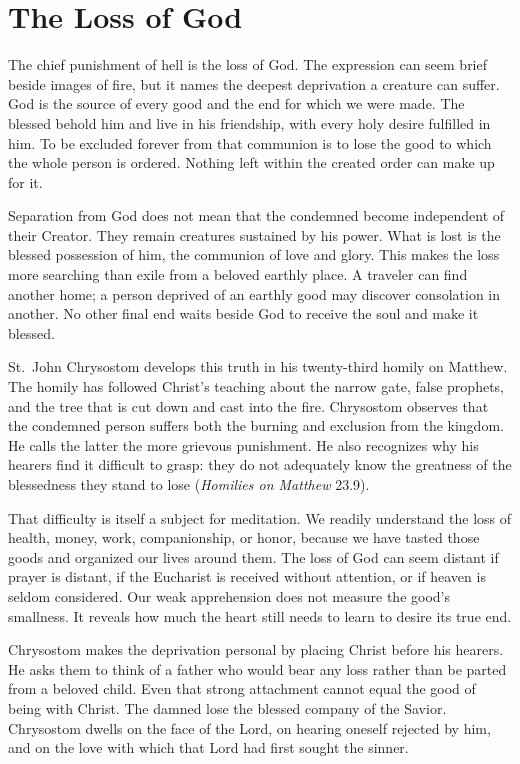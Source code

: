 \section{The Loss of God}

The chief punishment of hell is the loss of God. The expression can seem brief beside images of fire, but it names the deepest deprivation a creature can suffer. God is the source of every good and the end for which we were made. The blessed behold him and live in his friendship, with every holy desire fulfilled in him. To be excluded forever from that communion is to lose the good to which the whole person is ordered. Nothing left within the created order can make up for it.

Separation from God does not mean that the condemned become independent of their Creator. They remain creatures sustained by his power. What is lost is the blessed possession of him, the communion of love and glory. This makes the loss more searching than exile from a beloved earthly place. A traveler can find another home; a person deprived of an earthly good may discover consolation in another. No other final end waits beside God to receive the soul and make it blessed.

St.~John Chrysostom develops this truth in his twenty-third homily on Matthew. The homily has followed Christ's teaching about the narrow gate, false prophets, and the tree that is cut down and cast into the fire. Chrysostom observes that the condemned person suffers both the burning and exclusion from the kingdom. He calls the latter the more grievous punishment. He also recognizes why his hearers find it difficult to grasp: they do not adequately know the greatness of the blessedness they stand to lose (\emph{Homilies on Matthew} 23.9).

That difficulty is itself a subject for meditation. We readily understand the loss of health, money, work, companionship, or honor, because we have tasted those goods and organized our lives around them. The loss of God can seem distant if prayer is distant, if the Eucharist is received without attention, or if heaven is seldom considered. Our weak apprehension does not measure the good's smallness. It reveals how much the heart still needs to learn to desire its true end.

Chrysostom makes the deprivation personal by placing Christ before his hearers. He asks them to think of a father who would bear any loss rather than be parted from a beloved child. Even that strong attachment cannot equal the good of being with Christ. The damned lose the blessed company of the Savior. Chrysostom dwells on the face of the Lord, on hearing oneself rejected by him, and on the love with which that Lord had first sought the sinner.

